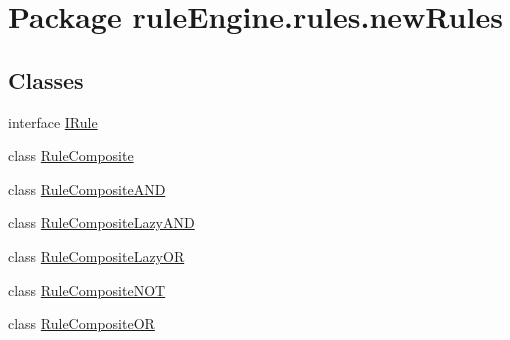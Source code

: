 \hypertarget{namespacerule_engine_1_1rules_1_1new_rules}{}\section{Package rule\+Engine.\+rules.\+new\+Rules}
\label{namespacerule_engine_1_1rules_1_1new_rules}
\subsection*{Classes}
\begin{DoxyCompactItemize}
\item 
interface \mbox{\hyperlink{interfacerule_engine_1_1rules_1_1new_rules_1_1_i_rule}{I\+Rule}}
\item 
class \mbox{\hyperlink{classrule_engine_1_1rules_1_1new_rules_1_1_rule_composite}{Rule\+Composite}}
\item 
class \mbox{\hyperlink{classrule_engine_1_1rules_1_1new_rules_1_1_rule_composite_a_n_d}{Rule\+Composite\+A\+ND}}
\item 
class \mbox{\hyperlink{classrule_engine_1_1rules_1_1new_rules_1_1_rule_composite_lazy_a_n_d}{Rule\+Composite\+Lazy\+A\+ND}}
\item 
class \mbox{\hyperlink{classrule_engine_1_1rules_1_1new_rules_1_1_rule_composite_lazy_o_r}{Rule\+Composite\+Lazy\+OR}}
\item 
class \mbox{\hyperlink{classrule_engine_1_1rules_1_1new_rules_1_1_rule_composite_n_o_t}{Rule\+Composite\+N\+OT}}
\item 
class \mbox{\hyperlink{classrule_engine_1_1rules_1_1new_rules_1_1_rule_composite_o_r}{Rule\+Composite\+OR}}
\end{DoxyCompactItemize}
